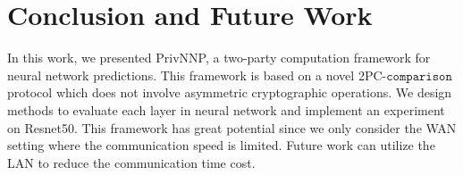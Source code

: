 \documentclass[letterpaper]{article} %
\begin{document}
    \section{Conclusion and Future Work}
    In this work, we presented PrivNNP, a two-party computation framework for neural network predictions.
    This framework is based on a novel 2PC-$\mathtt{comparison}$ protocol which does not involve asymmetric cryptographic operations.
    We design methods to evaluate each layer in neural network and implement an experiment on Resnet50.
    This framework has great potential
    since we only consider the WAN setting where the communication speed is limited.
    Future work can utilize the LAN to reduce the communication time cost.

\end{document}
